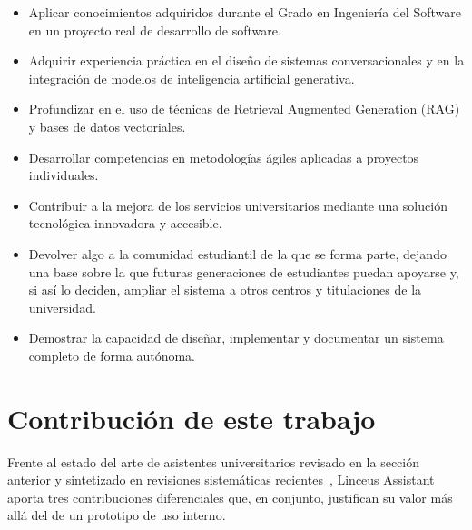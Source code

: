 \begin{itemize}
    \item Aplicar conocimientos adquiridos durante el Grado en Ingeniería del Software en un proyecto real de desarrollo de software.
    \item Adquirir experiencia práctica en el diseño de sistemas conversacionales y en la integración de modelos de inteligencia artificial generativa.
    \item Profundizar en el uso de técnicas de Retrieval Augmented Generation (RAG) y bases de datos vectoriales.
    \item Desarrollar competencias en metodologías ágiles aplicadas a proyectos individuales.
    \item Contribuir a la mejora de los servicios universitarios mediante una solución tecnológica innovadora y accesible.
    \item Devolver algo a la comunidad estudiantil de la que se forma parte, dejando una base sobre la que futuras generaciones de estudiantes puedan apoyarse y, si así lo deciden, ampliar el sistema a otros centros y titulaciones de la universidad.
    \item Demostrar la capacidad de diseñar, implementar y documentar un sistema completo de forma autónoma.
\end{itemize}



\section{Contribución de este trabajo}\label{sec:contribucion}

Frente al estado del arte de asistentes universitarios revisado en la sección anterior y sintetizado en revisiones sistemáticas recientes~\cite{wollny2021survey}, Linceus Assistant aporta tres contribuciones diferenciales que, en conjunto, justifican su valor más allá del de un prototipo de uso interno.

